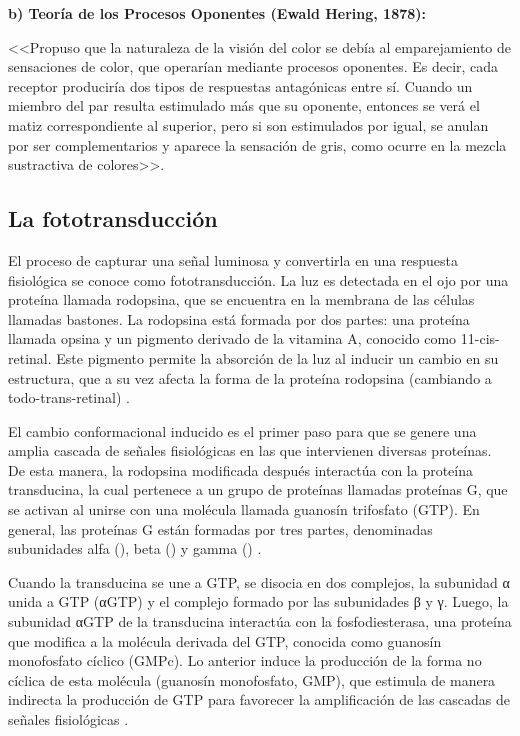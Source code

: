 \documentclass[10pt]{article}
\begin{document}
\setlength{\parskip}{2mm}

\textbf{b) Teoría de los Procesos Oponentes (Ewald Hering, 1878):}
 
<<Propuso que la naturaleza de la visión del color se debía al emparejamiento de sensaciones de color, que operarían mediante procesos oponentes. Es decir, cada receptor produciría dos tipos de respuestas antagónicas entre sí. Cuando un miembro del par resulta estimulado más que su oponente, entonces se verá el matiz correspondiente al superior, pero si son estimulados por igual, se anulan por ser complementarios y aparece la sensación de gris, como ocurre en la mezcla sustractiva de colores>>\cite{IEEEreferencias:Ref14}.

\subsection{La fototransducción}

El proceso de capturar una señal luminosa y convertirla en una respuesta fisiológica se conoce como fototransducción. La luz es detectada en el ojo por una proteína llamada rodopsina, que se encuentra en la membrana de las células llamadas bastones. La rodopsina está formada por dos partes: una proteína llamada opsina y un pigmento derivado de la vitamina A, conocido como 11-cis-retinal. Este pigmento permite la absorción de la luz al inducir un cambio en su estructura, que a su vez afecta la forma de la proteína rodopsina (cambiando a todo-trans-retinal) \cite{IEEEreferencias:Ref12}.

\setlength{\parskip}{2mm}

El cambio conformacional inducido es el primer paso para que se genere una amplia cascada de señales fisiológicas en las que intervienen diversas proteínas. De esta manera, la rodopsina modificada después interactúa con la proteína transducina, la cual pertenece a un grupo de proteínas llamadas proteínas G, que se activan al unirse con una molécula llamada guanosín trifosfato (GTP). En general, las proteínas G están formadas por tres partes, denominadas subunidades alfa (\alpha), beta (\beta) y gamma (\gamma) \cite{IEEEreferencias:Ref12}. 

\setlength{\parskip}{2mm}

Cuando la transducina se une a GTP, se disocia en dos complejos, la subunidad α unida a GTP
(αGTP) y el complejo formado por las subunidades β y γ. Luego, la subunidad αGTP de la transducina interactúa con la fosfodiesterasa, una proteína que modifica a la molécula derivada del GTP, conocida como guanosín monofosfato cíclico (GMPc). Lo anterior induce la producción de la forma no cíclica de esta molécula (guanosín monofosfato, GMP), que estimula de manera indirecta la producción de GTP para favorecer la amplificación de las cascadas de señales fisiológicas \cite{IEEEreferencias:Ref12}.
\end{document}
